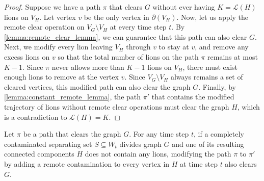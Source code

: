 \documentclass[a4paper,UKenglish,cleveref, autoref, thm-restate]{lipics-v2021}
\begin{document}
\begin{proof}
Suppose we have a path $\pi$ that clears $G$ without ever having $K=\mathcal{L}(H)$ lions on $V_H$. Let vertex $v$ be the only vertex in $\partial(V_H)$. Now, let us apply the remote clear operation on $V_G\setminus V_H$ at every time step $t$. By \cref{lemma:remote_clear_lemma}, we can guarantee that this path can also clear $G$. Next, we modify every lion leaving $V_H$ through $v$ to stay at $v$, and remove any excess lions on $v$ so that the total number of lions on the path $\pi$ remains at most $K-1$. Since $\pi$ never allows more than $K-1$ lions on $V_H$, there must exist enough lions to remove at the vertex $v$. Since $V_G\setminus V_H$ always remains a set of cleared vertices, this modified path can also clear the graph $G$. Finally, by \cref{lemma:constant_remote_lemma}, the path $\pi'$ that contains the modified trajectory of lions without remote clear operations must clear the graph $H$, which is a contradiction to $\mathcal{L}(H)=K$.
\end{proof}

\begin{lemma}\label{lemma:instant_contamination_lemma}
Let $\pi$ be a path that clears the graph $G$. For any time step $t$, if a completely contaminated separating set $S \subseteq W_t$ divides graph $G$ and one of its resulting connected components $H$ does not contain any lions, modifying the path $\pi$ to $\pi'$ by adding a remote contamination to every vertex in $H$ at time step $t$ also clears $G$.
\end{lemma}
\end{document}
